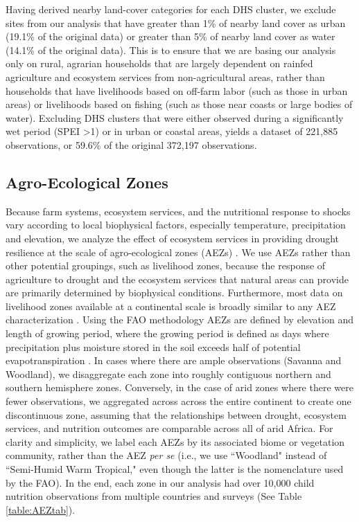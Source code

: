 \documentclass{article}
\begin{document}
Having derived nearby land-cover categories for each DHS cluster, we exclude sites from our analysis that have greater than 1\% of nearby land cover as urban (19.1\% of the original data) or greater than 5\% of nearby land cover as water (14.1\% of the original data).  This is to ensure that we are basing our analysis only on rural, agrarian households that are largely dependent on rainfed agriculture and ecosystem services from non-agricultural areas, rather than households that have livelihoods based on off-farm labor (such as those in urban areas) or livelihoods based on fishing (such as those near coasts or large bodies of water).  Excluding DHS clusters that were either observed during a significantly wet period (SPEI \textgreater 1) or in urban or coastal areas, yields a dataset of 221,885 observations, or 59.6\% of the original 372,197 observations.

\subsection{Agro-Ecological Zones}
Because farm systems, ecosystem services, and the nutritional response to shocks vary according to local biophysical factors, especially temperature, precipitation and elevation, we analyze the effect of ecosystem services in providing drought resilience at the scale of agro-ecological zones (AEZs) \cite{dimitrova2020monsoon}.  We use AEZs rather than other potential groupings, such as livelihood zones, because the response of agriculture to drought and the ecosystem services that natural areas can provide are primarily determined by biophysical conditions.  Furthermore, most data on livelihood zones available at a continental scale is broadly similar to any AEZ characterization \cite{Lynam2002}.  Using the FAO methodology \cite{Fischer2006} AEZs are defined by elevation and length of growing period, where the growing period is defined as days where precipitation plus moisture stored in the soil exceeds half of potential evapotranspiration \cite{Fischer2006}.  In cases where there are ample observations (Savanna and Woodland), we disaggregate each zone into roughly contiguous northern and southern hemisphere zones.  Conversely, in the case of arid zones where there were fewer observations, we aggregated across across the entire continent to create one discontinuous zone, assuming that the relationships between drought, ecosystem services, and nutrition outcomes are comparable across all of arid Africa.  For clarity and simplicity, we label each AEZs by its associated biome or vegetation community, rather than the AEZ \textit{per se} (i.e., we use ``Woodland" instead of ``Semi-Humid Warm Tropical," even though the latter is the nomenclature used by the FAO).  In the end, each zone in our analysis had over 10,000 child nutrition observations from multiple countries and surveys (See Table \ref{table:AEZtab}).
\end{document}
